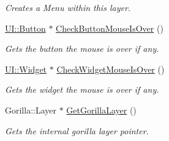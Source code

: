 \begin{DoxyCompactItemize}
\begin{DoxyCompactList}\small\item\em Creates a Menu within this layer. \item\end{DoxyCompactList}\item 
\hyperlink{classphys_1_1UI_1_1Button}{UI::Button} $\ast$ \hyperlink{classphys_1_1UILayer_ac28c19dea53d2b89c5c09a2e29ce8c6d}{CheckButtonMouseIsOver} ()
\begin{DoxyCompactList}\small\item\em Gets the button the mouse is over if any. \item\end{DoxyCompactList}\item 
\hyperlink{classphys_1_1UI_1_1Widget}{UI::Widget} $\ast$ \hyperlink{classphys_1_1UILayer_ae121ca4d2ebb6fec7351a5c1eaab3dfc}{CheckWidgetMouseIsOver} ()
\begin{DoxyCompactList}\small\item\em Gets the widget the mouse is over if any. \item\end{DoxyCompactList}\item 
Gorilla::Layer $\ast$ \hyperlink{classphys_1_1UILayer_a0f1d04779794d4401714b0d8fa90cab5}{GetGorillaLayer} ()
\begin{DoxyCompactList}\small\item\em Gets the internal gorilla layer pointer. \item\end{DoxyCompactList}\end{DoxyCompactItemize}
